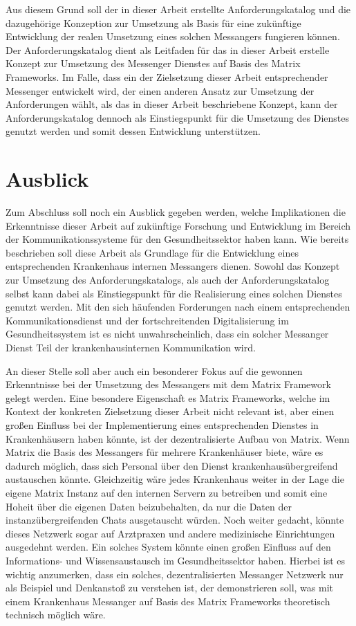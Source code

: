 Aus diesem Grund soll der in dieser Arbeit erstellte Anforderungskatalog und die dazugehörige Konzeption zur Umsetzung als Basis für eine zukünftige Entwicklung der realen Umsetzung eines solchen Messangers fungieren können. 
Der Anforderungskatalog dient als Leitfaden für das in dieser Arbeit erstelle Konzept zur Umsetzung des Messenger Dienstes auf Basis des Matrix Frameworks. Im Falle, dass ein der Zielsetzung dieser Arbeit entsprechender Messenger entwickelt wird, der einen anderen Ansatz zur Umsetzung der Anforderungen wählt, als das in dieser Arbeit beschriebene Konzept, kann der Anforderungskatalog dennoch als Einstiegspunkt für die Umsetzung des Dienstes genutzt werden und somit dessen Entwicklung unterstützen.

\section{Ausblick}\label{chapter:fazit}
Zum Abschluss soll noch ein Ausblick gegeben werden, welche Implikationen die Erkenntnisse dieser Arbeit auf zukünftige Forschung und Entwicklung im Bereich der Kommunikationssysteme für den Gesundheitssektor haben kann. Wie bereits beschrieben soll diese Arbeit als Grundlage für die Entwicklung eines entsprechenden Krankenhaus internen Messangers dienen. Sowohl das Konzept zur Umsetzung des Anforderungskatalogs, als auch der Anforderungskatalog selbst kann dabei als Einstiegspunkt für die Realisierung eines solchen Dienstes genutzt werden. Mit den sich häufenden Forderungen nach einem entsprechenden Kommunikationsdienst und der fortschreitenden Digitalisierung im Gesundheitssystem ist es nicht unwahrscheinlich, dass ein solcher Messanger Dienst Teil der krankenhausinternen Kommunikation wird. 

An dieser Stelle soll aber auch ein besonderer Fokus auf die gewonnen Erkenntnisse bei der Umsetzung des Messangers mit dem Matrix Framework gelegt werden. Eine besondere Eigenschaft es Matrix Frameworks, welche im Kontext der konkreten Zielsetzung dieser Arbeit nicht relevant ist, aber einen großen Einfluss bei der Implementierung eines entsprechenden Dienstes in Krankenhäusern haben könnte, ist der dezentralisierte Aufbau von Matrix. Wenn Matrix die Basis des Messangers für mehrere Krankenhäuser biete, wäre es dadurch möglich, dass sich Personal über den Dienst krankenhausübergreifend austauschen könnte. Gleichzeitig wäre jedes Krankenhaus weiter in der Lage die eigene Matrix Instanz auf den internen Servern zu betreiben und somit eine Hoheit über die eigenen Daten beizubehalten, da nur die Daten der instanzübergreifenden Chats ausgetauscht würden. Noch weiter gedacht, könnte dieses Netzwerk sogar auf Arztpraxen und andere medizinische Einrichtungen ausgedehnt werden. Ein solches System könnte einen großen Einfluss auf den Informations- und Wissensaustausch im Gesundheitssektor haben. Hierbei ist es wichtig anzumerken, dass ein solches, dezentralisierten Messanger Netzwerk nur als Beispiel und Denkanstoß zu verstehen ist, der demonstrieren soll, was mit einem Krankenhaus Messanger auf Basis des Matrix Frameworks theoretisch technisch möglich wäre. 

